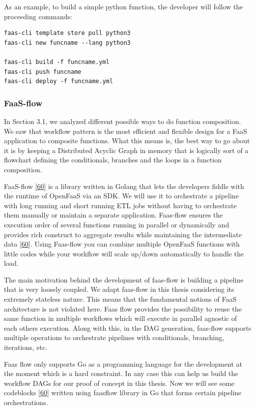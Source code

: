 \documentclass[12pt,titlepage]{article}
\begin{document}
As an example, to build a simple python function, the developer will follow the
proceeding commands:

\begin{lstlisting}
faas-cli template store pull python3
faas-cli new funcname --lang python3

faas-cli build -f funcname.yml
faas-cli push funcname
faas-cli deploy -f funcname.yml
\end{lstlisting}

\subsubsection{FaaS-flow}
\label{sec:org1bf9082}
In Section 3.1, we analyzed different possible ways to do function composition.
We saw that workflow pattern is the most efficient and flexible design for a
FaaS application to composite functions. What this means is, the best way to go
about it is by keeping a Distributed Acyclic Graph in memory that is logically
sort of a flowchart defining the conditionals, branches and the loops in a
function composition.

FaaS-flow \hyperref[ref:60]{[60}] is a library written in Golang that lets the developers fiddle with
the runtime of OpenFaaS via an SDK. We will use it to orchestrate a pipeline with long running and short running
ETL jobs without having to orchestrate them manually or
maintain a separate application. Faas-flow ensures the execution order of
several functions running in parallel or dynamically and provides rich construct
to aggregate results while maintaining the intermediate data \hyperref[ref:60]{[60}].  Using
Faas-flow you can combine multiple OpenFaaS functions with little codes while
your workflow will scale up/down automatically to handle the load.

The main motivation behind the development of faas-flow is building a pipeline
that is very loosely coupled. We adapt faas-flow in this thesis considering its
extremely stateless nature. This means that the fundamental notions of FaaS
architecture is not violated here. Faas flow provides the possibility to reuse
the same function in multiple workflows which will execute in parallel agnostic
of each others execution. Along with this, in the DAG generation, faas-flow
supports multiple operations to orchestrate pipelines with conditionals,
branching, iterations, etc.

Faas flow only supports Go as a programming language for the development at the
moment which is a hard constraint. In any case this can help us build the
workflow DAGs for our proof of concept in this thesis. Now we will see some
codeblocks \hyperref[ref:60]{[60}] written using faasflow library in Go that forms certain pipeline
orchestrations.
\end{document}
